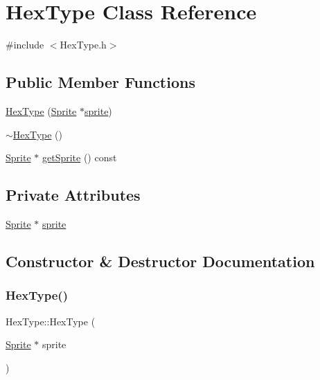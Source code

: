 \hypertarget{class_hex_type}{}\section{Hex\+Type Class Reference}
\label{class_hex_type}


{\ttfamily \#include $<$Hex\+Type.\+h$>$}

\subsection*{Public Member Functions}
\begin{DoxyCompactItemize}
\item 
\hyperlink{class_hex_type_a6f84936badf5e987570417f500f3d388}{Hex\+Type} (\hyperlink{class_sprite}{Sprite} $\ast$\hyperlink{class_hex_type_a7f1c5fa0871568503aba259e76ce8758}{sprite})
\item 
\hyperlink{class_hex_type_ac0b7d6bad02fd7bf5bcf355e2f3b5cd1}{$\sim$\+Hex\+Type} ()
\item 
\hyperlink{class_sprite}{Sprite} $\ast$ \hyperlink{class_hex_type_af3d3b65517191fda8edcab4c2477f5eb}{get\+Sprite} () const
\end{DoxyCompactItemize}
\subsection*{Private Attributes}
\begin{DoxyCompactItemize}
\item 
\hyperlink{class_sprite}{Sprite} $\ast$ \hyperlink{class_hex_type_a7f1c5fa0871568503aba259e76ce8758}{sprite}
\end{DoxyCompactItemize}


\subsection{Constructor \& Destructor Documentation}
\mbox{\label{class_hex_type_a6f84936badf5e987570417f500f3d388}} 
\subsubsection{\texorpdfstring{Hex\+Type()}{HexType()}}
{\footnotesize\ttfamily Hex\+Type\+::\+Hex\+Type (\begin{DoxyParamCaption}\item[{\hyperlink{class_sprite}{Sprite} $\ast$}]{sprite }\end{DoxyParamCaption})}

